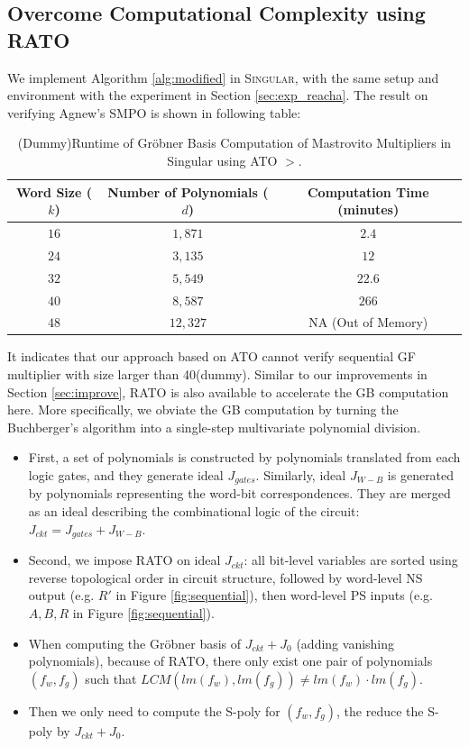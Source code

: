\subsection{Overcome Computational Complexity using RATO}
We implement Algorithm \ref{alg:modified} in \textsc{Singular}, with the same setup and environment 
with the experiment in Section \ref{sec:exp_reacha}. The result on verifying Agnew's SMPO is shown 
in following table:

\begin{table}[H]
\label{tab:slimgb}
	\begin{center}
	    \caption{(Dummy)Runtime of Gr\"obner Basis Computation of Mastrovito Multipliers in Singular using ATO $>$.}\label{tab:ATO}
	    \begin{tabular}{|c|c||c|} 
	        \hline
		Word Size ($k$) & Number of Polynomials ($d$) & Computation Time (minutes)   \\
		\hline
	        $16$	&  $1,871$  & $2.4$ \\
		$24$	&  $3,135$  & $12$  \\
	        $32$	&  $5,549$  & $22.6$ \\
	        $40$	&  $8,587$  & $266$ \\
		$48$	& $12,327$  & NA (Out of Memory) \\
	        \hline
	    \end{tabular}
	\end{center} 
\end{table}

It indicates that our approach based on ATO cannot verify sequential GF multiplier with size larger than 40(dummy).
Similar to our improvements in Section \ref{sec:improve}, RATO \cite{TimDAC} is also available to 
accelerate the GB computation here. More specifically, we obviate the GB computation by turning the Buchberger's algorithm 
into a single-step multivariate polynomial division.

\begin{itemize}
\item First, a set of polynomials is constructed by polynomials translated from each logic gates, and they generate 
ideal $J_{gates}$. Similarly, ideal $J_{W-B}$ is generated by polynomials representing the word-bit correspondences.
They are merged as an ideal describing the combinational logic of the circuit: $J_{ckt} = J_{gates} + J_{W-B}$.
\item Second, we impose RATO on ideal $J_{ckt}$: all bit-level variables are sorted using reverse topological order
in circuit structure, followed by word-level NS output (e.g. $R'$ in Figure \ref{fig:sequential}), 
then word-level PS inputs (e.g. $A,B,R$ in Figure \ref{fig:sequential}).
\item When computing the Gr\"obner basis of $J_{ckt}+J_0$ (adding vanishing polynomials), because of 
RATO, there only exist one pair of polynomials $(f_w,f_g)$ such that $LCM(lm(f_w),lm(f_g)) \neq lm(f_w)\cdot lm(f_g)$.
\item Then we only need to compute the S-poly for $(f_w,f_g)$, the reduce the S-poly by $J_{ckt}+J_0$.
\end{itemize}

